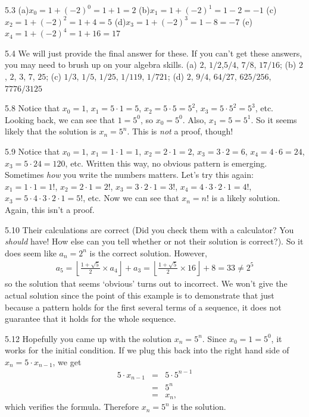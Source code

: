 \begin{Answer}{5.3}
 (a)$x_0=1+(-2)^0 = 1 + 1 = 2$
 (b)$x_1=1+(-2)^1 = 1-2=-1$
 (c)$x_2=1+(-2)^2=1+4= 5$
 (d)$x_3=1+(-2)^3=1-8=-7$
 (e)$x_4=1+(-2)^4=1+16=17$
\end{Answer}
\begin{Answer}{5.4}
We will just provide the final answer for these.  If you can't get these answers, you may need to brush
up on your algebra skills.
(a) $2$, $1/2$,$5/4$, $7/8$, $17/16$;
(b) $2$, $2$, $3$, $7$, $25$;
(c) $1/3$, $1/5$, $1/25$, $1/119$, $1/721$;
(d) $2$, $9/4$, $64/27$, $625/256$, $7776/3125$
\end{Answer}
\begin{Answer}{5.8}
Notice that $x_0=1$, $x_1=5\cdot 1 = 5$, $x_2=5\cdot 5=5^2$, $x_3=5\cdot 5^2 = 5^3$, etc.
Looking back, we can see that $1=5^0$, so $x_0=5^0$.  Also, $x_1=5=5^1$.  So it seems likely that the
solution is $x_n=5^n$.  This is {\em not} a proof, though!
\end{Answer}
\begin{Answer}{5.9}
Notice that $x_0=1$,
$x_1=1\cdot 1 = 1$,
$x_2=2\cdot 1=2$,
$x_3=3\cdot 2 = 6$,
$x_4=4\cdot 6 = 24$,
$x_3=5\cdot 24 = 120$, etc.
Written this way, no obvious pattern is emerging.  Sometimes {\em how} you write the numbers matters.
Let's try this again:
$x_1=1\cdot 1 = 1!$,
$x_2=2\cdot 1=2!$,
$x_3=3\cdot 2\cdot 1=3!$,
$x_4=4\cdot 3\cdot 2\cdot 1=4!$,
$x_3=5\cdot 4\cdot 3\cdot 2\cdot 1=5!$, etc.
Now we can see that $x_n=n!$ is a likely solution.  Again, this isn't a proof.
\end{Answer}
\begin{Answer}{5.10}
Their calculations are correct (Did you check them with a calculator?  You {\em should} have!
How else can you tell whether or not their solution is correct?).
So it does seem like $a_n=2^n$ is the correct solution.
However,
$$\begin{array}{lllllll}
a_5  = \left\lfloor \frac{1+\sqrt{5}}{2}\times a_4\right\rfloor+a_3=
 \left\lfloor \frac{1+\sqrt{5}}{2}\times 16\right\rfloor+8=33\neq 2^5
\end{array}$$
so the solution that seems `obvious' turns out to incorrect.
We won't give the actual solution since the point of this example is to demonstrate
that just because a pattern holds for the first several terms of a sequence, it does not
guarantee that it holds for the whole sequence.
\end{Answer}
\begin{Answer}{5.12}
Hopefully you came up with the solution $x_n=5^n$.
Since $x_0=1=5^0$, it works for the initial condition.
If we plug this back into the
right hand side of $x_n=5\cdot x_{n-1}$,  we get
\begin{eqnarray*}
5\cdot x_{n-1}&=&5\cdot 5^{n-1}\\
&=&5^n\\
&=&x_n,
\end{eqnarray*}
which verifies the formula.  Therefore $x_n=5^n$ is the solution.
\end{Answer}
